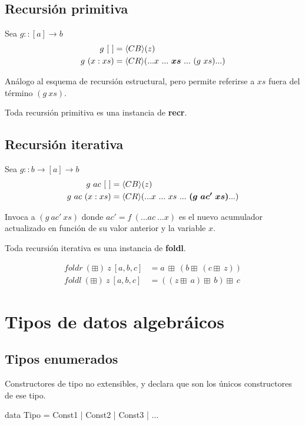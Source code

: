 \documentclass{article}
\begin{document}
\subsection{Recursión primitiva}
Sea $g :: [a] \to b$
\begin{align}
g \ [\ ] &= \langle CB\rangle(z) \\
g\ (x:xs) &= \langle CR\rangle(... x\ ...\ \bm{xs}\ ...\ (g\ xs) ...)
\end{align}

\par\noindent
Análogo al esquema de recursión estructural, pero permite referirse a $xs$ fuera del término $(g\ xs)$.

\par\noindent
Toda recursión primitiva es una instancia de \textbf{recr}.

\subsection{Recursión iterativa}
Sea $g :: b \to [a] \to b$
\begin{align}
g\ ac \emptyList &= \langle CB\rangle(z) \\
g\ ac\ (x:xs) &= \langle CR\rangle(... x\ ...\ xs\ ...\ \bm{(g\ ac'\ xs)} ...)
\end{align}
\par\noindent
Invoca a $(g\ ac'\ xs)$ donde $ac' = f\  (...ac\ ...x)$ es el nuevo acumulador actualizado en función de su valor anterior y la variable $x$.
\par\noindent
Toda recursión iterativa es una instancia de \textbf{foldl}.

\begin{align*}
foldr\ (\boxplus)\ z\ [a,b,c] &= a\ \boxplus\ (b \boxplus\ (c \boxplus\ z)) \\
foldl\ (\boxplus)\ z\ [a,b,c] &= ((z  \boxplus\ a)  \boxplus\ b) \boxplus\ c
\end{align*}


\section{Tipos de datos algebráicos}
\subsection{Tipos enumerados}
Constructores de tipo no extensibles, y declara que son los únicos constructores de ese tipo.

\begin{centeredhaskcode}
data Tipo = Const1 | Const2 | Const3 | ...
\end{centeredhaskcode}
\end{document}
